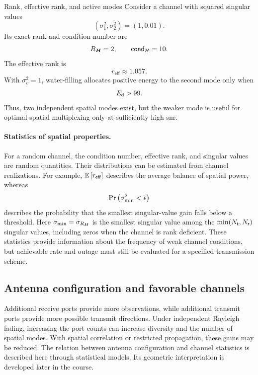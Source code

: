\begin{example}{Rank, effective rank, and active modes}
	Consider a channel with squared singular values
	\begin{equation*}
		(\sigma_1^2,\sigma_2^2)=(1,0.01).
	\end{equation*}
	Its exact rank and condition number are
	\begin{equation*}
		R_{\bm{H}}=2,\qquad \mathsf{cond}_{H}=10.
	\end{equation*}
	The effective rank is
	\begin{equation*}
		r_{\mathsf{eff}}\approx1.057.
	\end{equation*}
	With $\sigma_v^2=1$, water-filling allocates
	positive energy to the second mode only when
	\begin{equation*}
		E_{\mathsf{d}}>99.
	\end{equation*}
	Thus, two independent spatial modes exist,
	but the weaker mode is useful for optimal
	spatial multiplexing only at sufficiently
	high \ac{snr}.
\end{example}

\paragraph{Statistics of spatial properties.}
For a random channel, the condition number,
effective rank, and singular values are
random quantities.
%
Their distributions can be estimated from
channel realizations. For example,
$\mathbb{E}\left[r_{\mathsf{eff}}\right]$ describes the average
balance of spatial power, whereas
\begin{equation*}
	\Pr\left(\sigma_{\min}^2<\epsilon\right)
\end{equation*}
describes the probability that the smallest
singular-value gain falls below a threshold.
Here $\sigma_{\min} = \sigma_{R_{\bm{H}}}$ is the smallest
singular value among the
$\min(N_{\mathsf{t}},N_{\mathsf{r}})$ singular values, including
zeros when the channel is rank deficient.
%
These statistics provide information about
the frequency of weak channel conditions,
but achievable rate and outage must still
be evaluated for a specified transmission
scheme.


\subsection{Antenna configuration and favorable channels}

Additional receive ports provide more observations,
while additional transmit ports provide more
possible transmit directions.
%
Under independent Rayleigh fading, increasing
the port counts can increase diversity and
the number of spatial modes.
With spatial correlation or restricted propagation,
these gains may be reduced.
%
The relation between antenna configuration and
channel statistics is described here through
statistical models. Its geometric interpretation
is developed later in the course.

